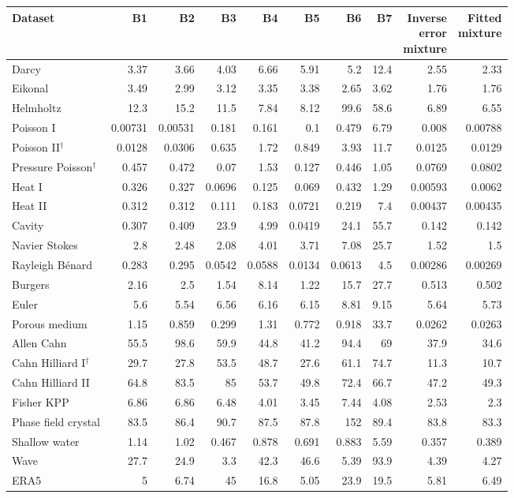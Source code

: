 \begin{tabular}{lrrrrrrrrr}
\toprule
Dataset & B1 & B2 & B3 & B4 & B5 & B6 & B7 & \shortstack[r]{Inverse\\error\\mixture} & \shortstack[r]{Fitted\\mixture} \\
\midrule
Darcy & 3.37 & 3.66 & 4.03 & 6.66 & 5.91 & 5.2 & 12.4 & 2.55 & 2.33 \\
Eikonal & 3.49 & 2.99 & 3.12 & 3.35 & 3.38 & 2.65 & 3.62 & 1.76 & 1.76 \\
Helmholtz & 12.3 & 15.2 & 11.5 & 7.84 & 8.12 & 99.6 & 58.6 & 6.89 & 6.55 \\
Poisson I & 0.00731 & 0.00531 & 0.181 & 0.161 & 0.1 & 0.479 & 6.79 & 0.008 & 0.00788 \\
Poisson II$^{\dagger}$ & 0.0128 & 0.0306 & 0.635 & 1.72 & 0.849 & 3.93 & 11.7 & 0.0125 & 0.0129 \\
Pressure Poisson$^{\dagger}$ & 0.457 & 0.472 & 0.07 & 1.53 & 0.127 & 0.446 & 1.05 & 0.0769 & 0.0802 \\
Heat I & 0.326 & 0.327 & 0.0696 & 0.125 & 0.069 & 0.432 & 1.29 & 0.00593 & 0.0062 \\
Heat II & 0.312 & 0.312 & 0.111 & 0.183 & 0.0721 & 0.219 & 7.4 & 0.00437 & 0.00435 \\
Cavity & 0.307 & 0.409 & 23.9 & 4.99 & 0.0419 & 24.1 & 55.7 & 0.142 & 0.142 \\
Navier Stokes & 2.8 & 2.48 & 2.08 & 4.01 & 3.71 & 7.08 & 25.7 & 1.52 & 1.5 \\
Rayleigh Bénard & 0.283 & 0.295 & 0.0542 & 0.0588 & 0.0134 & 0.0613 & 4.5 & 0.00286 & 0.00269 \\
Burgers & 2.16 & 2.5 & 1.54 & 8.14 & 1.22 & 15.7 & 27.7 & 0.513 & 0.502 \\
Euler & 5.6 & 5.54 & 6.56 & 6.16 & 6.15 & 8.81 & 9.15 & 5.64 & 5.73 \\
Porous medium & 1.15 & 0.859 & 0.299 & 1.31 & 0.772 & 0.918 & 33.7 & 0.0262 & 0.0263 \\
Allen Cahn & 55.5 & 98.6 & 59.9 & 44.8 & 41.2 & 94.4 & 69 & 37.9 & 34.6 \\
Cahn Hilliard I$^{\dagger}$ & 29.7 & 27.8 & 53.5 & 48.7 & 27.6 & 61.1 & 74.7 & 11.3 & 10.7 \\
Cahn Hilliard II & 64.8 & 83.5 & 85 & 53.7 & 49.8 & 72.4 & 66.7 & 47.2 & 49.3 \\
Fisher KPP & 6.86 & 6.86 & 6.48 & 4.01 & 3.45 & 7.44 & 4.08 & 2.53 & 2.3 \\
Phase field crystal & 83.5 & 86.4 & 90.7 & 87.5 & 87.8 & 152 & 89.4 & 83.8 & 83.3 \\
Shallow water & 1.14 & 1.02 & 0.467 & 0.878 & 0.691 & 0.883 & 5.59 & 0.357 & 0.389 \\
Wave & 27.7 & 24.9 & 3.3 & 42.3 & 46.6 & 5.39 & 93.9 & 4.39 & 4.27 \\
\midrule ERA5 & 5 & 6.74 & 45 & 16.8 & 5.05 & 23.9 & 19.5 & 5.81 & 6.49 \\
\bottomrule
\end{tabular}
